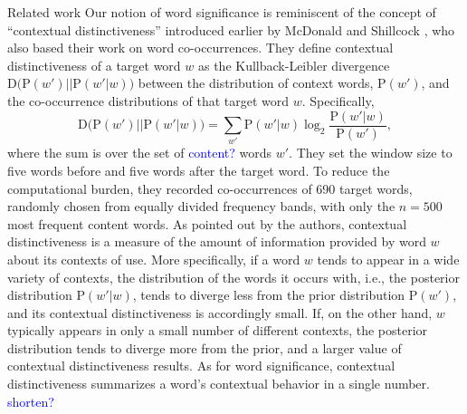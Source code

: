 \documentclass{article} %
\newcommand{\p}{\mathrm{P}}
\begin{document}
\begin{section}{Related work}\label{related-work}
Our notion of word significance is reminiscent of the concept of
``contextual distinctiveness'' introduced earlier by McDonald and
Shillcock \cite{mcdonald2001contextual}, who also based their work on word co-occurrences.
They define contextual distinctiveness of a target word $w$ as the
Kullback-Leibler divergence $\mathrm{D} \big(\p(w') ||\p(w'|w) \big)$
between the distribution of context words, $\p(w')$, and the
co-occurrence distributions of that target word $w$.  Specifically,
\begin{equation} 
\label{cd}
\mathrm{D} \big(\p(w') ||\p(w'|w) \big) = \sum_{w'} \p(w'|w) \log_2
\frac{\p(w'|w)}{\p(w')},
\end{equation} 
where the sum is over the set of \textcolor{blue}{content?} words $w'$.  They set the
window size to five words before and five words after the target word.
To reduce the computational burden, they recorded co-occurrences of 690
target words, randomly chosen from equally divided frequency bands, with
only the $n=500$ most frequent content words.  As pointed out by the
authors, contextual distinctiveness is a measure of the amount of
information provided by word $w$ about its contexts of use.  More specifically, if a
word $w$ tends to appear in a wide variety of contexts, the distribution
of the words it occurs with, i.e., the posterior distribution $\p(w'|w)$,
tends to diverge less from the prior distribution $\p(w')$, and its
contextual distinctiveness is accordingly small.  If, on the other hand,
$w$ typically appears in only a small number of different contexts, the
posterior distribution tends to diverge more from the prior, and a
larger value of contextual distinctiveness results.  As for
word significance, contextual distinctiveness summarizes a word's
contextual behavior in a single number. \textcolor{blue}{shorten?}


\end{section}
\end{document}
